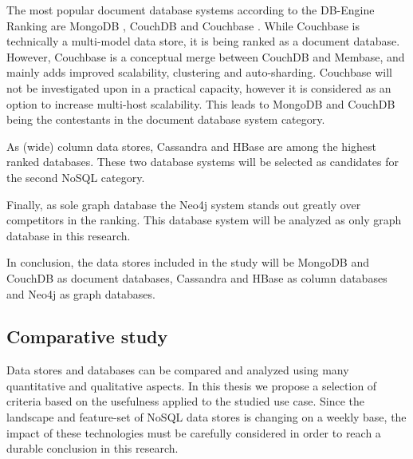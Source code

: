 The most popular document database systems according to the DB-Engine Ranking are MongoDB \autocite{MongoDB2009}, CouchDB \autocite{CouchDB2005} and Couchbase \autocite{Couchbase2010}. While Couchbase is technically a multi-model data store, it is being ranked as a document database. However, Couchbase is a conceptual merge between CouchDB and Membase, and mainly adds improved scalability, clustering and auto-sharding. Couchbase will not be investigated upon in a practical capacity, however it is considered as an option to increase multi-host scalability. This leads to MongoDB and CouchDB being the contestants in the document database system category.

As (wide) column data stores, Cassandra \autocite{Cassandra2008} and HBase \autocite{HBase2005} are among the highest ranked databases. These two database systems will be selected as candidates for the second NoSQL category.

Finally, as sole graph database the Neo4j system \autocite{Neo4j2007} stands out greatly over competitors in the ranking. This database system will be analyzed as only graph database in this research.

In conclusion, the data stores included in the study will be MongoDB and CouchDB as document databases, Cassandra and HBase as column databases and Neo4j as graph databases.

\subsection{Comparative study}
\label{sec:comparative study}

Data stores and databases can be compared and analyzed using many quantitative and qualitative aspects. In this thesis we propose a selection of criteria based on the usefulness applied to the studied use case. Since the landscape and feature-set of NoSQL data stores is changing on a weekly base, the impact of these technologies must be carefully considered in order to reach a durable conclusion in this research.

  
